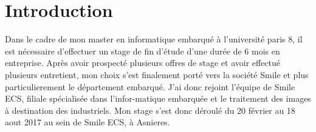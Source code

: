 \section{Introduction}

Dans le cadre de mon master en informatique embarqué à l'université paris 8, il est
nécessaire d’effectuer un stage de fin d’étude d’une durée de 6 mois en entreprise.
Après avoir prospecté plusieurs offres de stage et avoir effectué plusieurs entretient,
mon choix s’est finalement porté vers la société Smile et plus particulierement le département
embarqué.
J’ai donc rejoint l'équipe de Smile ECS, filiale spécialisée dans l’infor-matique
embarquée et le traitement des images à destination des industriels.
Mon stage s’est donc déroulé du 20 février au 18 aout 2017 au sein de Smile ECS,
à Asnieres.
